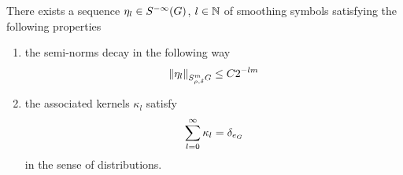 \begin{theorem}
\label{theorem:Littlewood-Paley_decomposition}
    There exists a sequence $\eta_l \in \SmoothingSymbols$, $l \in \N$ of smoothing symbols satisfying the following properties
    \begin{enumerate}
        \item the semi-norms decay in the following way
            \begin{align}
                \SymbolSemiNorm{m}{\rho, \delta}{\eta_l} \leq C 2^{-lm}
            \end{align}
        \item the associated kernels $\kappa_l$ satisfy
            \begin{align*}
                \sum_{l = 0}^\infty \kappa_l = \DiracDelta{e_\Group}
            \end{align*}
            in the sense of distributions.
    \end{enumerate}
\end{theorem}
